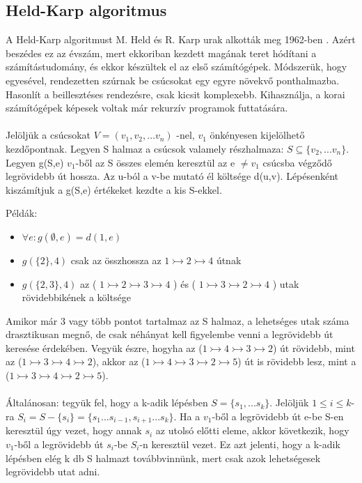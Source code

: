 \subsection{Held-Karp algoritmus }
A Held-Karp algoritmust M. Held és R. Karp urak alkották meg 1962-ben \cite{HeldKarp}. Azért beszédes ez az évszám, mert ekkoriban kezdett magának teret hódítani a számítástudomány, és ekkor készültek el az első számítógépek. Módszerük, hogy egyesével, rendezetten szúrnak be csúcsokat egy egyre növekvő ponthalmazba. Hasonlít a beillesztéses rendezésre, csak kicsit komplexebb. Kihasználja, a korai számítógépek képesek voltak már rekurzív programok futtatására.
\paragraph{}
Jelöljük a csúcsokat \( V=\left(v_1,v_2,\ldots v_n\right) \) -nel, \(v_1\) önkényesen kijelölhető kezdőpontnak. Legyen S halmaz a csúcsok valamely részhalmaza: \(S \subseteq \{v_2,...v_n\}\). Legyen g(S,e) \(v_1\)-ből az S összes elemén keresztül az e \(\neq v_1\)  csúcsba végződő legrövidebb út hossza. Az u-ból a v-be mutató él költsége d(u,v).
Lépésenként kiszámítjuk a g(S,e) értékeket kezdte a kis S-ekkel.

Példák:
\begin{itemize}
	\item \(\forall e: g(\emptyset,e) = d(1,e)\)
	\item \(g(\{2\},4)\) csak az összhossza az  \(1 \rightarrowtail 2 \rightarrowtail 4\) útnak
	\item \(g(\{2,3\},4)\)  az ( \(1 \rightarrowtail 2 \rightarrowtail 3 \rightarrowtail 4\) ) és ( \(1 \rightarrowtail 3 \rightarrowtail 2 \rightarrowtail 4\) ) utak rövidebbikének a költsége
\end{itemize}

Amikor már 3 vagy több pontot tartalmaz az S halmaz, a lehetséges utak száma drasztikusan megnő, de csak néhányat kell figyelembe venni a legrövidebb út keresése érdekében. Vegyük észre, hogyha az (\(1\rightarrowtail 4\rightarrowtail 3\rightarrowtail 2\)) út rövidebb, mint az (\(1\rightarrowtail 3\rightarrowtail 4\rightarrowtail 2\)), akkor az (\(1\rightarrowtail 4\rightarrowtail 3\rightarrowtail 2\rightarrowtail 5\)) út is rövidebb lesz, mint a (\(1\rightarrowtail 3\rightarrowtail 4\rightarrowtail 2\rightarrowtail 5\)).
\paragraph{}
Általánosan: tegyük fel, hogy a k-adik lépésben \(S=\{s_1,...s_k\}\). Jelöljük \(1\leqslant i\leqslant k\)-ra \(S_i = S-\{s_i\} = \{s_1...s_{i-1},s_{i+1}...s_k\} \). Ha a \(v_1\)-ből a legrövidebb út e-be S-en keresztül úgy vezet, hogy annak \(s_i\) az utolsó előtti eleme, akkor következik, hogy \(v_1\)-ből a legrövidebb út \(s_i\)-be \(S_i\)-n keresztül vezet. Ez azt jelenti, hogy a k-adik lépésben elég k db S halmazt továbbvinnünk, mert csak azok lehetségesek legrövidebb utat adni.

